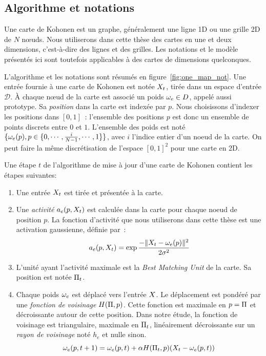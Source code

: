 \documentclass[../main]{subfiles}
\begin{document}
\subsection{Algorithme et notations}

Une carte de Kohonen est un graphe, généralement une ligne 1D ou une grille 2D de $N$ n\oe{}uds. Nous utiliserons dans cette thèse des cartes en une et deux dimensions, c'est-à-dire des lignes et des grilles. Les notations et le modèle présentés ici sont toutefois applicables à des cartes de dimensions quelconques.

L'algorithme et les notations sont résumés en figure~\ref{fig:one_map_not}. Une entrée fournie à une carte de Kohonen est notée $X_t$, tirée dans un espace d'entrée $\mathcal{D}$. \`A chaque n\oe{}ud de la carte est associé un poids $\omega_e \in D$, appelé aussi prototype. Sa \emph{position} dans la carte est indexée par $p$. Nous choisissons d'indexer les positions dans $[0,1]$~: l'ensemble des positions $p$ est donc un ensemble de points discrets entre $0$ et $1$. L'ensemble des poids est noté $\{\omega_e(p), p \in \{0,\cdots,\frac{i}{N-1}, \cdots, 1\}\}$, avec $i$ l'indice entier d'un noeud de la carte. On peut faire la même discrétisation de l'espace $[0,1]^2$ pour une carte en 2D.

Une étape $t$ de l'algorithme de mise à jour d'une carte de Kohonen contient les étapes suivantes:
\begin{enumerate}
\item\label{enum:inp} Une entrée $X_t$ est tirée et présentée à la carte.
\item\label{enum:act} Une \emph{activité} $a_e(p,X_t)$ est calculée dans la carte pour chaque noeud de position $p$. La fonction d'activité que nous utiliserons dans cette thèse est une activation gaussienne, définie par~:
\begin{equation}\label{eq:act1som}
a_e(p, X_t) = \exp{\frac{-\lVert X_t-\omega_{e}(p) \rVert ^2}{2\sigma^2}}
\end{equation}
\item\label{enum:bmu} L'unité ayant l'activité maximale est la \emph{Best Matching Unit} de la carte. Sa position est notée $\Pi_t$.
\item Chaque poids $\omega_e$ est déplacé vers l'entrée $X$. Le déplacement est pondéré par une \emph{fonction de voisinage} $H(\Pi,p)$. Cette fonction est maximale en $p = \Pi$ et décroissante autour de cette position. Dans notre étude, la fonction de voisinage est triangulaire, maximale en $\Pi_t$, linéairement décroissante sur un \emph{rayon de voisinage} noté $h_e$ et nulle sinon.
\begin{equation}
\omega_e(p,t+1) = \omega_e(p,t) + \alpha H(\Pi_t,p)(X_t - \omega_e(p,t))
\label{eq:update}
\end{equation}
\end{enumerate}
\end{document}
